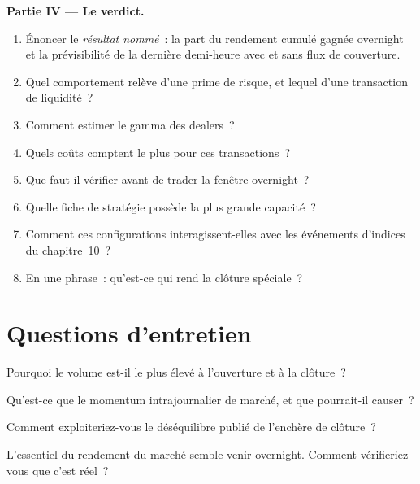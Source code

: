 \begin{problem}
\medskip\noindent\textbf{Partie IV --- Le verdict.}
\begin{enumerate}[resume]
\item Énoncer le \emph{résultat nommé}~: la part du rendement cumulé gagnée overnight et la prévisibilité de la dernière demi-heure avec et sans
flux de couverture.
\item Quel comportement relève d'une prime de risque, et lequel d'une transaction de liquidité~?
\item Comment estimer le gamma des dealers~?
\item Quels coûts comptent le plus pour ces transactions~?
\item Que faut-il vérifier avant de trader la fenêtre overnight~?
\item Quelle fiche de stratégie possède la plus grande capacité~?
\item Comment ces configurations interagissent-elles avec les événements d'indices du chapitre~10~?
\item En une phrase~: qu'est-ce qui rend la clôture spéciale~?
\end{enumerate}
\end{problem}

\section{Questions d'entretien}

\begin{interviewq}\label{iq:s1:intraday-patterns:1}
Pourquoi le volume est-il le plus élevé à l'ouverture et à la clôture~?
\end{interviewq}

\begin{interviewq}\label{iq:s1:intraday-patterns:2}
Qu'est-ce que le momentum intrajournalier de marché, et que pourrait-il causer~?
\end{interviewq}

\begin{interviewq}\label{iq:s1:intraday-patterns:3}
Comment exploiteriez-vous le déséquilibre publié de l'enchère de clôture~?
\end{interviewq}

\begin{interviewq}\label{iq:s1:intraday-patterns:4}
L'essentiel du rendement du marché semble venir overnight. Comment vérifieriez-vous que c'est réel~?
\end{interviewq}

